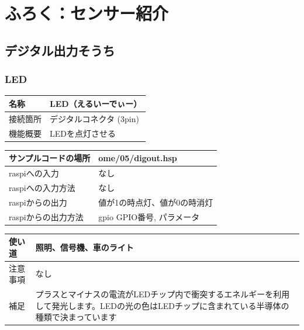 \section{ふろく：センサー紹介}\label{sensor_intr}
\subsection{デジタル出力そうち}

\newlength{\colF}
\setlength{\colF}{0.25\columnwidth}
\newlength{\colG}
\setlength{\colG}{0.65\columnwidth}
\newlength{\colH}
\setlength{\colH}{0.1\columnwidth}
\newlength{\colI}
\setlength{\colI}{0.35\columnwidth}

\subsubsection{LED}\label{LED}
\begin{table}[H]
	\begin{tabular}{|p{\colF}|p{\colG}|}	\hline
	名称 & LED（えるいーでぃー）\\ \hline
	接続箇所 & デジタルコネクタ (3pin)\\ \hline
	機能概要 & LEDを点灯させる\\ \hline
  \end{tabular}
\end{table}

\begin{table}[H]
	\begin{tabular}{|p{\colF}|p{\colG}|}	\hline
	サンプルコードの場所 & ome/05/digout.hsp\\ \hline
	raspiへの入力 & なし\\ \hline
	raspiへの入力方法 & なし\\ \hline
	raspiからの出力 & 値が1の時点灯、値が0の時消灯\\ \hline
	raspiからの出力方法 & gpio GPIO番号, パラメータ\\ \hline
  \end{tabular}
\end{table}

\begin{table}[H]
	\begin{tabular}{|p{\colF}|p{\colG}|} \hline
	使い道 & 照明、信号機、車のライト\\ \hline
	注意事項 & なし\\ \hline
	補足 & プラスとマイナスの電流がLEDチップ内で衝突するエネルギーを利用して発光します。LEDの光の色はLEDチップに含まれている半導体の種類で決まっています\\ \hline
  \end{tabular}
\end{table}


